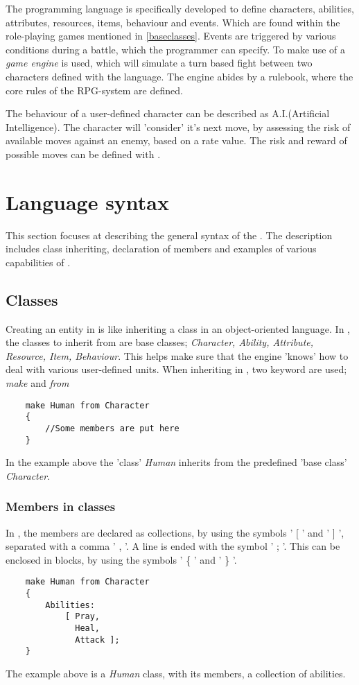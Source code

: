 The programming language \langname{} is specifically developed to define characters, abilities, attributes, resources, items, behaviour and events. Which are found within the role-playing games mentioned in \vref{baseclasses}. Events are triggered by various conditions during a battle, which the programmer can specify.
To make use of \langname{} a \emph{game engine} is used, which will simulate a turn based fight between two characters defined with the language. The engine abides by a rulebook, where the core rules of the RPG-system are defined. 

The behaviour of a user-defined character can be described as A.I.(Artificial Intelligence). The character will 'consider' it's next move, by assessing the risk of available moves against an enemy, based on a rate value. The risk and reward of possible moves can be defined with \langname{}.

\section{Language syntax}
This section focuses at describing the general syntax of the \langname{}. The description includes class inheriting, declaration of members and examples of various capabilities of \langname{}.

\subsection{Classes}
Creating an entity in \langname{} is like inheriting a class in an object-oriented language.
In \langname{}, the classes to inherit from are base classes; \emph{Character, Ability, Attribute, Resource, Item, Behaviour}. This helps make sure that the engine 'knows' how to deal with various user-defined units.
When inheriting in \langname{}, two keyword are used; \emph{make} and \emph{from}
\begin{lstlisting}
	make Human from Character
	{
		//Some members are put here
	}
\end{lstlisting}
In the example above the 'class' \emph{Human} inherits from the predefined 'base class' \emph{Character}.

\subsubsection*{Members in classes}
In \langname{}, the members are declared as collections, by using the symbols ' [ ' and ' ] ', separated with a comma ' , '.
A line is ended with the symbol ' ; '.
This can be enclosed in blocks, by using the symbols ' \{ ' and ' \} '.
\begin{lstlisting}
	make Human from Character
	{	
		Abilities:
			[ Pray, 
			  Heal,
			  Attack ];
	}
\end{lstlisting}
The example above is a \emph{Human} class, with its members, a collection of abilities.

